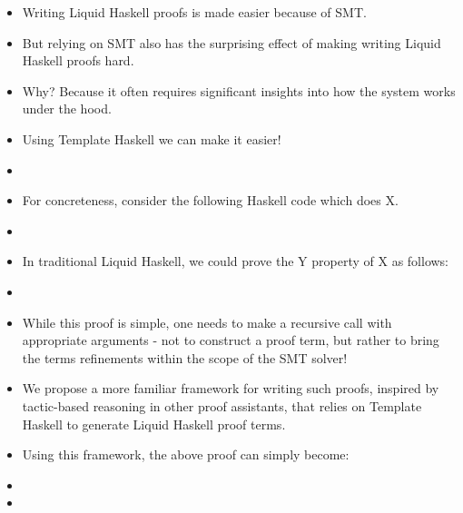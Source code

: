 \documentclass[sigplan,screen]{acmart}
\begin{document}


\maketitle



\begin{itemize}
\item Writing Liquid Haskell proofs is made easier because of SMT.
\item But relying on SMT also has the surprising effect of making writing Liquid
  Haskell proofs hard.
\item Why? Because it often requires significant insights into how the system
  works under the hood.
\item Using Template Haskell we can make it easier!
\item
\item For concreteness, consider the following Haskell code which does X.
\item {}
\item In traditional Liquid Haskell, we could prove the Y property of X as follows:
\item {}
\item While this proof is simple, one needs to make a recursive call with appropriate
  arguments - not to construct a proof term, but rather to bring the terms refinements
  within the scope of the SMT solver!
\item We propose a more familiar framework for writing such proofs, inspired by
  tactic-based reasoning in other proof assistants, that relies on Template Haskell
  to generate Liquid Haskell proof terms.
\item Using this framework, the above proof can simply become:
\item {}
\item {}
\end{itemize}  
\end{document}
